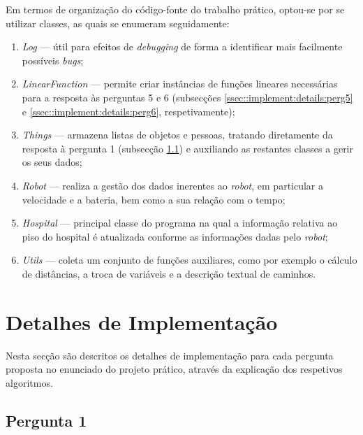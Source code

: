 
Em termos de organização do código-fonte do trabalho prático, optou-se por se utilizar classes, as quais se enumeram seguidamente:

\begin{enumerate}
	\item \emph{Log} --- útil para efeitos de \emph{debugging} de forma a identificar mais facilmente possíveis \emph{bugs};
	
	\item \emph{LinearFunction} --- permite criar instâncias de funções lineares necessárias para a resposta às perguntas 5 e 6 (subsecções \ref{ssec::implement:details:perg5} e \ref{ssec::implement:details:perg6}, respetivamente);
	
	\item \emph{Things} --- armazena listas de objetos e pessoas, tratando diretamente da resposta à pergunta 1 (subsecção \ref{ssec::implement:details:perg1}) e auxiliando as restantes classes a gerir os seus dados;
	
	\item \emph{Robot} --- realiza a gestão dos dados inerentes ao \textit{robot}, em particular a velocidade e a bateria, bem como a sua relação com o tempo;
	
	\item \emph{Hospital} --- principal classe do programa na qual a informação relativa ao piso do hospital é atualizada conforme as informações dadas pelo \emph{robot};
	
	\item \emph{Utils} --- coleta um conjunto de funções auxiliares, como por exemplo o cálculo de distâncias, a troca de variáveis e a descrição textual de caminhos.
\end{enumerate}


\section{Detalhes de Implementação}
\label{sec::implement:details}

Nesta secção são descritos os detalhes de implementação para cada pergunta proposta no enunciado do projeto prático, através da explicação dos respetivos algoritmos.


\subsection{Pergunta 1}
\label{ssec::implement:details:perg1}

